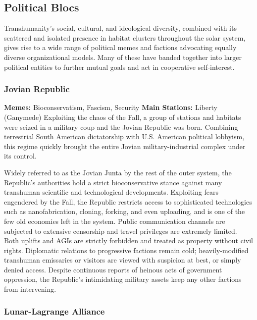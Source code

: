 \subsection{Political Blocs}

Transhumanity's social, cultural, and ideological 
diversity, combined with its scattered and isolated 
presence in habitat clusters throughout the solar 
system, gives rise to a wide range of political memes 
and factions advocating equally diverse organizational 
models. Many of these have banded together into 
larger political entities to further mutual goals and act 
in cooperative self-interest.

\subsubsection{Jovian Republic}

\textbf{Memes:} Bioconservatism, Fascism, Security
\textbf{Main Stations:} Liberty (Ganymede)
Exploiting the chaos of the Fall, a group of stations 
and habitats were seized in a military coup and the 
Jovian Republic was born. Combining terrestrial 
South American dictatorship with U.S. American political lobbyism, this regime quickly brought the entire 
Jovian military-industrial complex under its control.

Widely referred to as the 
Jovian Junta by the rest of the 
outer system, the Republic's authorities hold a 
strict bioconservative 
stance against many 
transhuman scientific 
and technological developments. Exploiting fears 
engendered by the Fall, the Republic restricts access to sophisticated technologies such as nanofabrication, cloning, 
forking, and even uploading, and is one of the few 
old economies left in the system. Public communication channels are subjected to extensive censorship 
and travel privileges are extremely limited. Both 
uplifts and AGIs are strictly forbidden and treated 
as property without civil rights. Diplomatic relations 
to progressive factions remain cold; heavily-modified 
transhuman emissaries or visitors are viewed with 
suspicion at best, or simply denied access. Despite 
continuous reports of heinous acts of government 
oppression, the Republic's intimidating military assets 
keep any other factions from intervening.

\subsubsection{Lunar-Lagrange Alliance}

